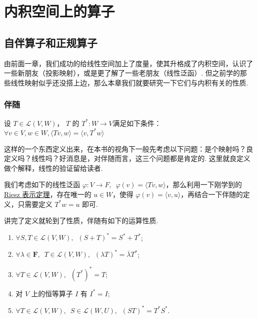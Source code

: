 \chapter{内积空间上的算子}

\section{自伴算子和正规算子}

由前面一章，我们成功的给线性空间加上了度量，使其升格成了内积空间，认识了一些新朋友（投影映射），或是更了解了一些老朋友（线性泛函）. 但之前学的那些线性映射似乎还没搭上边，那么本章我们就要研究一下它们与内积有关的性质.

\subsection{伴随}

\begin{definition}[伴随] 
    设 $ T \in \mathcal{L}(V, W) $， $ T $ 的 $ T^*: W \rightarrow V $满足如下条件： $ \forall v \in V, w \in W, \langle Tv, w \rangle = \langle v, T^*w \rangle$
\end{definition}

这样的一个东西定义出来，在本书的视角下一般先考虑以下问题：是个映射吗？良定义吗？线性吗？好消息是，对伴随而言，这三个问题都是肯定的. 这里就良定义做个解释，线性的验证留给读者.

我们考虑如下的线性泛函 $ \varphi : V \rightarrow F, \enspace \varphi (v) = \langle Tv, w \rangle $，那么利用一下刚学到的 \hyperref[thm:23:Riesz]{Riesz 表示定理}，存在唯一的 $ u \in W $，使得 $ \varphi (v) = \langle v, u \rangle $，再结合一下伴随的定义，只需要定义 $ T^*w = u $ 即可.

讲完了定义就轮到了性质，伴随有如下的运算性质.
\begin{enumerate}
    \item $ \forall S, T \in \mathcal{L}(V, W),\enspace (S + T)^* = S^* + T^* $;

    \item $ \forall \lambda \in \mathbf{F},\enspace T \in \mathcal{L}(V, W),\enspace (\lambda T)^* = \overline{\lambda} T^* $;

    \item $ \forall T \in \mathcal{L}(V, W),\enspace (T^*)^* = T $;

    \item 对 $ V $ 上的恒等算子 $ I $ 有 $ I^* = I $;

    \item $ \forall T \in \mathcal{L}(V, W),\enspace S \in \mathcal{L}(W, U),\enspace (ST)^* = T^*S^* $.
\end{enumerate}

